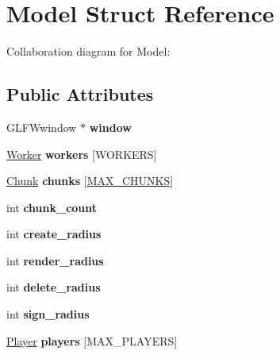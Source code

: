 \hypertarget{structModel}{}\section{Model Struct Reference}
\label{structModel}


Collaboration diagram for Model\+:
\subsection*{Public Attributes}
\begin{DoxyCompactItemize}
\item 
\mbox{\label{structModel_af15f84653ef65888f996e6b78c1d6ff7}} 
G\+L\+F\+Wwindow $\ast$ {\bfseries window}
\item 
\mbox{\label{structModel_af82468267fcf9f7720dd378e0a46bad7}} 
\hyperlink{structWorker}{Worker} {\bfseries workers} \mbox{[}W\+O\+R\+K\+E\+RS\mbox{]}
\item 
\mbox{\label{structModel_a454955bd2cbb283c269a5189d29b6362}} 
\hyperlink{structChunk}{Chunk} {\bfseries chunks} \mbox{[}\hyperlink{main_8c_a9e879c11aa15653382faa681060e6179}{M\+A\+X\+\_\+\+C\+H\+U\+N\+KS}\mbox{]}
\item 
\mbox{\label{structModel_ac890daa53d9fca686f850c61707534d3}} 
int {\bfseries chunk\+\_\+count}
\item 
\mbox{\label{structModel_ab285f5b424f0989de991724b7842f7ee}} 
int {\bfseries create\+\_\+radius}
\item 
\mbox{\label{structModel_a78738d6f90d8a11202fec26912dddcde}} 
int {\bfseries render\+\_\+radius}
\item 
\mbox{\label{structModel_a424db0f8c4b9225fc177664d0564b9f6}} 
int {\bfseries delete\+\_\+radius}
\item 
\mbox{\label{structModel_a27a1d8e175370c2b238acb4e6f68e9b7}} 
int {\bfseries sign\+\_\+radius}
\item 
\mbox{\label{structModel_a35889c6e0321e390c7cc35678b561f0c}} 
\hyperlink{structPlayer}{Player} {\bfseries players} \mbox{[}M\+A\+X\+\_\+\+P\+L\+A\+Y\+E\+RS\mbox{]}

\end{DoxyCompactItemize}
